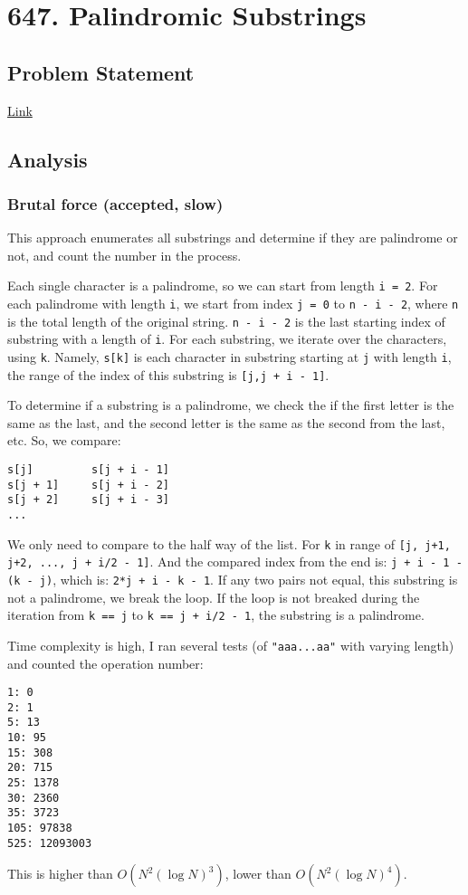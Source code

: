 \documentclass[12pt]{article}
\begin{document}
\section{647. Palindromic Substrings}
\label{sec:org2d5abd7}
\subsection{Problem Statement}
\label{sec:org67ac292}
\href{https://leetcode.com/problems/palindromic-substrings/}{Link}
\subsection{Analysis}
\label{sec:orgd575d32}
\subsubsection{Brutal force (accepted, slow)}
\label{sec:orgfad599c}
This approach enumerates all substrings and determine if they are palindrome or not, and count the number in the process.

Each single character is a palindrome, so we can start from length \texttt{i = 2}. For each palindrome with length \texttt{i}, we start from index \texttt{j = 0} to \texttt{n - i - 2}, where \texttt{n} is the total length of the original string. \texttt{n - i - 2} is the last starting index of substring with a length of \texttt{i}. For each substring, we iterate over the characters, using \texttt{k}. Namely, \texttt{s[k]} is each character in substring starting at \texttt{j} with length \texttt{i}, the range of the index of this substring is \texttt{[j,j + i - 1]}.

To determine if a substring is a palindrome, we check the if the first letter is the same as the last, and the second letter is the same as the second from the last, etc. So, we compare:
\begin{verbatim}
s[j]         s[j + i - 1]
s[j + 1]     s[j + i - 2]
s[j + 2]     s[j + i - 3]
...
\end{verbatim}
We only need to compare to the half way of the list. For \texttt{k} in range of \texttt{[j, j+1, j+2, ..., j + i/2 - 1]}. And the compared index from the end is: \texttt{j + i - 1 - (k - j)}, which is: \texttt{2*j + i - k - 1}. If any two pairs not equal, this substring is not a palindrome, we break the loop. If the loop is not breaked during the iteration from \texttt{k == j} to \texttt{k == j + i/2 - 1}, the substring is a palindrome.

Time complexity is high, I ran several tests (of \texttt{"aaa...aa"} with varying length) and counted the operation number:
\begin{verbatim}
1: 0
2: 1
5: 13
10: 95
15: 308
20: 715
25: 1378
30: 2360
35: 3723
105: 97838
525: 12093003
\end{verbatim}
This is higher than \(O(N^2(\log{N})^3)\), lower than \(O(N^2(\log{N})^4)\). 
\end{document}
